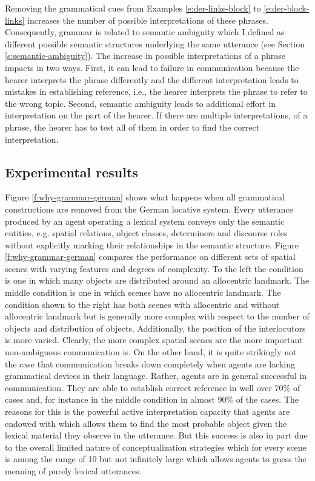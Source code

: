 Removing the grammatical cues from 
Examples \ref{e:der-linke-block} to \ref{e:der-block-links}
increases the number of possible interpretations of these phrases.
Consequently, grammar is related to semantic 
ambiguity which I defined as different possible semantic structures underlying the 
same utterance (see Section \ref{s:semantic-ambiguity}). 
The increase in possible interpretations of a phrase
impacts in two ways. First, it can lead to failure in communication 
because the hearer interprets the phrase differently and the different 
interpretation leads to mistakes in 
establishing reference, i.e., the hearer interprets the phrase to refer to the wrong
topic. Second, semantic ambiguity leads to additional 
effort in interpretation on the part of the hearer. If there are multiple interpretations, of 
a phrase, the hearer has to test all of them in order to find the correct interpretation.

\subsection{Experimental results}
Figure \ref{f:why-grammar-german} shows what happens when all 
grammatical constructions are removed from the German locative 
system. Every utterance produced by an agent operating a lexical 
system conveys only the semantic entities, e.g. spatial relations, 
object classes, determiners and discourse roles without explicitly 
marking their relationships in the semantic structure. Figure 
\ref{f:why-grammar-german} compares the performance on different 
sets of spatial scenes with varying features and degrees of complexity. 
To the left the condition is one in which many objects are distributed 
around an allocentric landmark. The middle condition is one in which 
scenes have no allocentric landmark. The condition 
shown to the right has both scenes with allocentric and 
without allocentric landmark but is generally more complex with 
respect to the number of objects and distribution of objects. 
Additionally, the position of the interlocutors is more varied. Clearly, the more complex 
spatial scenes are the more important non-ambiguous communication is. On the other hand, 
it is quite strikingly not the case that communication breaks down completely when agents are lacking grammatical devices in their language. Rather, agents are in general successful in communication. 
They are able to establish correct reference in well over 70\% of cases and, for instance in the middle condition in almost 90\% of the cases. 
The reasons for this is the powerful active interpretation capacity that agents are
endowed with which allows them to find the most probable object given the 
lexical material they observe in the utterance. But this success is also in part 
due to the overall limited nature of conceptualization strategies which for every 
scene is among the range of 10 but not infinitely large which allows agents to guess 
the meaning of purely lexical utterances.

